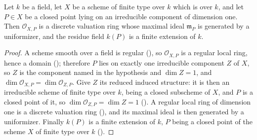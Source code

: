 \begin{lemma}
\label{lem:pcb-smooth-curve-local-dvr}
Let \(k\) be a field, let \(X\) be a scheme of finite type over \(k\)
which is  over \(k\), and let
\(P\in X\) be a closed point lying on an irreducible component of
dimension one.  Then \(\mathcal O_{X,P}\) is a discrete valuation ring
whose maximal ideal \(\mathfrak m_P\) is generated by a uniformizer, and
the residue field \(k(P)\) is a finite extension of \(k\).
\end{lemma}
\begin{proof}
A scheme smooth over a field is regular
(), so \(\mathcal O_{X,P}\) is a
regular local ring, hence a domain
(); therefore \(P\) lies on exactly
one irreducible component \(Z\) of \(X\), so \(Z\) is the component
named in the hypothesis and \(\dim Z=1\), and
\(\dim\mathcal O_{X,P}=\dim\mathcal O_{Z,P}\).  Give \(Z\) its reduced
induced structure: it is then an irreducible scheme of finite type over
\(k\), being a closed subscheme of \(X\), and \(P\) is a closed point of
it, so \(\dim\mathcal O_{Z,P}=\dim Z=1\)
().  A regular local ring of
dimension one is a discrete valuation ring
(), and its maximal ideal is then
generated by a uniformizer.  Finally \(k(P)\) is a finite extension of
\(k\), \(P\) being a closed point of the scheme \(X\) of finite type
over \(k\) ().
\end{proof}


